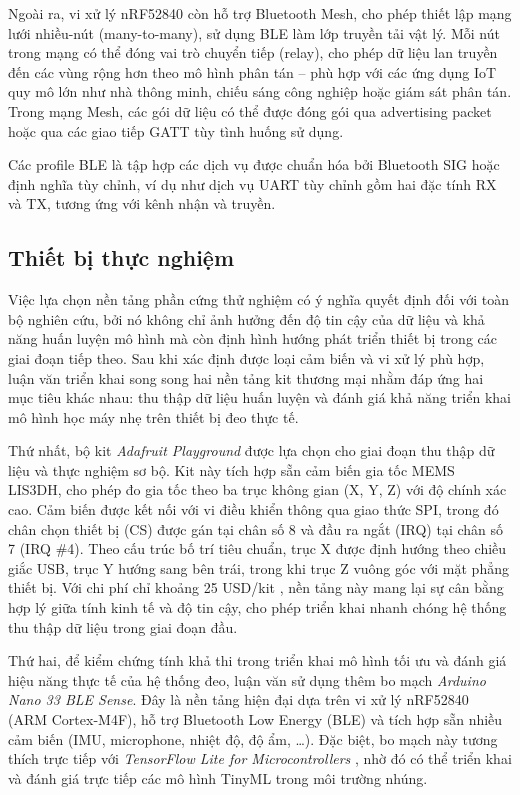 Ngoài ra, vi xử lý nRF52840 còn hỗ trợ Bluetooth Mesh, cho phép thiết 
lập mạng lưới nhiều-nút (many-to-many), sử dụng BLE làm lớp truyền tải 
vật lý. Mỗi nút trong mạng có thể đóng vai trò chuyển tiếp (relay), 
cho phép dữ liệu lan truyền đến các vùng rộng hơn theo mô hình phân 
tán – phù hợp với các ứng dụng IoT quy mô lớn như nhà thông minh, 
chiếu sáng công nghiệp hoặc giám sát phân tán. Trong mạng Mesh, 
các gói dữ liệu có thể được đóng gói qua advertising packet hoặc 
qua các giao tiếp GATT tùy tình huống sử dụng.

Các profile BLE là tập hợp các dịch vụ được chuẩn hóa bởi Bluetooth 
SIG hoặc định nghĩa tùy chỉnh, ví dụ như dịch vụ UART tùy chỉnh gồm 
hai đặc tính RX và TX, tương ứng với kênh nhận và truyền.

\subsection{Thiết bị thực nghiệm}

Việc lựa chọn nền tảng phần cứng thử nghiệm có ý nghĩa quyết định đối với 
toàn bộ nghiên cứu, bởi nó không chỉ ảnh hưởng đến độ tin cậy của dữ liệu 
và khả năng huấn luyện mô hình mà còn định hình hướng phát triển thiết bị 
trong các giai đoạn tiếp theo. Sau khi xác định được loại cảm biến và vi xử 
lý phù hợp, luận văn triển khai song song hai nền tảng kit thương mại nhằm 
đáp ứng hai mục tiêu khác nhau: thu thập dữ liệu huấn luyện và đánh giá 
khả năng triển khai mô hình học máy nhẹ trên thiết bị đeo thực tế.  

Thứ nhất, bộ kit \textit{Adafruit Playground} được lựa chọn cho giai đoạn 
thu thập dữ liệu và thực nghiệm sơ bộ. Kit này tích hợp sẵn cảm biến gia tốc 
MEMS LIS3DH, cho phép đo gia tốc theo ba trục không gian (X, Y, Z) với độ 
chính xác cao. Cảm biến được kết nối với vi điều khiển thông qua giao thức 
SPI, trong đó chân chọn thiết bị (CS) được gán tại chân số 8 và đầu ra ngắt 
(IRQ) tại chân số 7 (IRQ \#4). Theo cấu trúc bố trí tiêu chuẩn, trục X được 
định hướng theo chiều giắc USB, trục Y hướng sang bên trái, trong khi trục Z 
vuông góc với mặt phẳng thiết bị. Với chi phí chỉ khoảng 25 USD/kit 
\cite{ada_overview}, nền tảng này mang lại sự cân bằng hợp lý giữa tính 
kinh tế và độ tin cậy, cho phép triển khai nhanh chóng hệ thống thu thập dữ 
liệu trong giai đoạn đầu.  

Thứ hai, để kiểm chứng tính khả thi trong triển khai mô hình tối ưu và đánh 
giá hiệu năng thực tế của hệ thống đeo, luận văn sử dụng thêm bo mạch 
\textit{Arduino Nano 33 BLE Sense}. Đây là nền tảng hiện đại dựa trên vi 
xử lý nRF52840 (ARM Cortex-M4F), hỗ trợ Bluetooth Low Energy (BLE) và 
tích hợp sẵn nhiều cảm biến (IMU, microphone, nhiệt độ, độ ẩm, \ldots). 
Đặc biệt, bo mạch này tương thích trực tiếp với \textit{TensorFlow Lite for 
Microcontrollers} \cite{nano33ble}, nhờ đó có thể triển khai và đánh giá trực 
tiếp các mô hình TinyML trong môi trường nhúng.  

